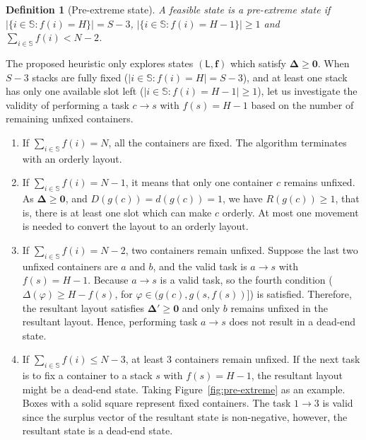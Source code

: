 \documentclass[review,3p,times,12pt,number]{elsarticle}\usepackage{amsmath}\usepackage{amssymb}
\newtheorem{definition}{Definition}
\begin{document}
\begin{definition}[Pre-extreme state]
A feasible state is a pre-extreme state if $|\{i\in\mathbb{S}: f(i)=H\}|=S-3$, $|\{i\in\mathbb{S}: f(i)=H-1\}|\ge 1$ and $\sum_{i\in\mathbb{S}}f(i)<N-2$.
\end{definition}

The proposed heuristic only explores states $(\mathsf{L},\boldsymbol{f})$ which satisfy $\boldsymbol{\Delta}\ge \boldsymbol{0}$.
When $S-3$ stacks are fully fixed ($|i \in \mathbb S : f(i)= H| = S- 3$), and at least one stack has only one available slot left ($|i \in \mathbb S : f(i) = H-1| \ge 1$), let us investigate the validity of performing a task $c\rightarrow s$ with $f(s)=H-1$ based on the number of remaining unfixed containers.
\begin{enumerate}
\item If $\sum_{i\in\mathbb{S}} f(i) = N$, all the containers are fixed. The algorithm terminates with an orderly layout.

\item If $\sum_{i\in\mathbb{S}} f(i) = N-1$, it means that only one container $c$ remains unfixed. As $\boldsymbol{\Delta}\ge \boldsymbol {0}$, and $D(g(c))=d(g(c))=1$, we have $R(g(c))\ge1$, that is, there is at least one slot which can make $c$ orderly. At most one movement is needed to convert the layout to an orderly layout.

\item If $\sum_{i\in\mathbb{S}}f(i) = N-2$, two containers remain unfixed. Suppose the last two unfixed containers are $a$ and $b$, and the valid task is $a\rightarrow s$ with $f(s)=H-1$. Because $a\rightarrow s$ is a valid task, so the fourth condition ($\Delta(\varphi)\ge H-f(s)$, for $\varphi\in (g(c),g(s,f(s))]$) is satisfied. Therefore, the resultant layout satisfies $\boldsymbol \Delta' \ge \boldsymbol{0}$ and only $b$ remains unfixed in the resultant layout. Hence, performing task $a\rightarrow s$ does not result in a dead-end state.

\item If $\sum_{i\in\mathbb{S}} f(i)\le N-3$, at least 3 containers remain unfixed. If the next task is to fix a container to a stack $s$ with $f(s)=H-1$, the resultant layout might be a dead-end state. Taking Figure~\ref{fig:pre-extreme} as an example. Boxes with a solid square represent fixed containers. The task $1\rightarrow 3$ is valid since the surplus vector of the resultant state is non-negative, however, the resultant state is a dead-end state.
\end{enumerate}
\end{document}
